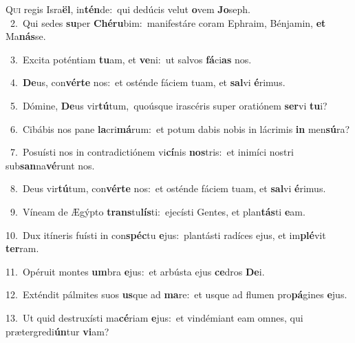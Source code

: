 \lettrine{\initial\textcolor{\initialcolor}{Q}}{ui} regis Isra\-\textbf{ël}\-, in\-\textbf{tén}\-de:~\star qui dedúcis velut \textbf{o}\-vem \textbf{Jo}\-seph.\\
{\numbfont\textcolor{\numbcolor}{~2.}}~Qui sedes \textbf{su}\-per \textbf{Ché}\-\textbf{ru}bim:~\star manifestáre coram Ephraim, Bénjamin, \textbf{et} Ma\-\textbf{nás}\-se.\par
{\numbfont\textcolor{\numbcolor}{~3.}}~Excita poténtiam \textbf{tu}\-am, et \textbf{ve}\-ni:~\star ut salvos \textbf{fá}\-ci\textbf{as} nos.\par
{\numbfont\textcolor{\numbcolor}{~4.}}~\-\textbf{De}\-us, con\-\textbf{vér}\-\textbf{te} nos:~\star et osténde fáciem tuam, et \textbf{sal}\-vi \textbf{é}\-rimus.\par
{\numbfont\textcolor{\numbcolor}{~5.}}~Dómine, \textbf{De}\-us vir\-\textbf{tú}\-tum,~\star quoúsque irascéris super oratiónem \textbf{ser}\-vi \textbf{tu}\-i?\par
{\numbfont\textcolor{\numbcolor}{~6.}}~Cibábis nos pane \textbf{la}\-cri\-\textbf{má}\-rum:~\star et potum dabis nobis in lácrimis \textbf{in} men\-\textbf{sú}\-ra?\par
{\numbfont\textcolor{\numbcolor}{~7.}}~Posuísti nos in contradictiónem vi\-\textbf{cí}\-nis \textbf{nos}\-tris:~\star et inimíci nostri sub\-\textbf{san}\-na\-\textbf{vé}\-runt nos.\par
{\numbfont\textcolor{\numbcolor}{~8.}}~Deus vir\-\textbf{tú}\-tum, con\-\textbf{vér}\-\textbf{te} nos:~\star et osténde fáciem tuam, et \textbf{sal}\-vi \textbf{é}\-rimus.\par
{\numbfont\textcolor{\numbcolor}{~9.}}~Víneam de Ægýpto \textbf{trans}\-tu\-\textbf{lís}\-ti:~\star ejecísti Gentes, et plan\-\textbf{tás}\-ti \textbf{e}\-am.\par
{\numbfont\textcolor{\numbcolor}{10.}}~Dux itíneris fuísti in con\-\textbf{spéc}\-tu \textbf{e}\-jus:~\star plantásti radíces ejus, et im\-\textbf{plé}\-vit \textbf{ter}\-ram.\par
{\numbfont\textcolor{\numbcolor}{11.}}~Opéruit montes \textbf{um}\-bra \textbf{e}\-jus:~\star et arbústa ejus \textbf{ce}\-dros \textbf{De}\-i.\par
{\numbfont\textcolor{\numbcolor}{12.}}~Exténdit pálmites suos \textbf{us}\-que ad \textbf{ma}\-re:~\star et usque ad flumen pro\-\textbf{pá}\-gines \textbf{e}\-jus.\par
{\numbfont\textcolor{\numbcolor}{13.}}~Ut quid destruxísti ma\-\textbf{cé}\-riam \textbf{e}\-jus:~\star et vindémiant eam omnes, qui prætergredi\-\textbf{ún}\-tur \textbf{vi}\-am?\par
